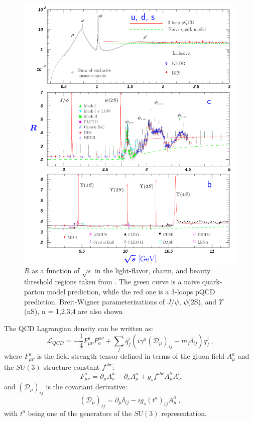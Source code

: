 \begin{figure}[p]
    \centering
    \includegraphics[width=\linewidth]{Figures/Chapter 1/rpp2022-R_udscb.pdf}
    \caption{$R$ as a function of $\sqrt{s}$ in the light-flavor, charm, and beauty threshold regions taken from \cite{pdg}. The green curve is a naive quark-parton model prediction, while the red one is a 3-loops pQCD prediction. Breit-Wigner parameterizations of $J/\psi$, $\psi$(2S), and $\Upsilon$(nS), n = 1,2,3,4 are also shown}
    \label{fig:R_vs_s}
\end{figure}

The QCD Lagrangian density can be written as:
\begin{equation}\label{eq:Lqcd}
    \mathcal{L}_{QCD}=-\frac{1}{4} F^a_{\mu\nu}F_a^{\mu\nu} + \sum_f \bar{q}_f^i (i\gamma^\mu(\mathcal{D}_\mu)_{ij}-m_f\delta_{ij})q_f^j\ ,
\end{equation}
where $F^a_{\mu\nu}$ is the field strength tensor defined in terms of the gluon field $A^a_\mu$ and the $SU(3)$ structure constant $f^{abc}$:
\begin{equation} \label{eq:F}
    F^a_{\mu\nu} = \partial_\mu A^a_\nu - \partial_\nu A^a_\mu + g_s f^{abc}A^b_\mu A^c_\nu 
\end{equation}
and $(\mathcal{D}_\mu)_{ij}$ is the covariant derivative:
\begin{equation*}
    (\mathcal{D}_\mu)_{ij} = \partial_\mu \delta_{ij} - ig_s(t^a)_{ij}A_\mu^a\ ,
\end{equation*}
with $t^a$ being one of the generators of the $SU(3)$ representation.

